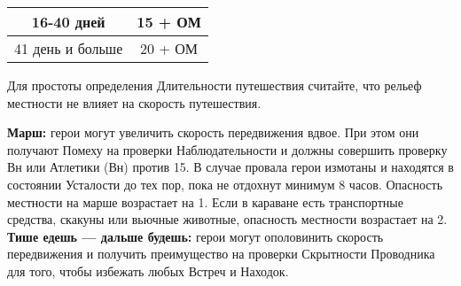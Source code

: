 \begin{enumerate}
\begin{center}
\begin{tabular}{|c|c|}
16-40 дней & 15 + ОМ \\ \hline
41 день и больше & 20 + ОМ \\ \hline
\end{tabular}
\end{center}
\begin{tcolorbox}
Для простоты определения Длительности путешествия считайте, что рельеф местности не влияет на скорость путешествия.
\end{tcolorbox}
\newline \textbf{Марш:} герои могут увеличить скорость передвижения вдвое. При этом они получают Помеху на проверки Наблюдательности и должны совершить проверку Вн или Атлетики (Вн) против 15. В случае провала герои измотаны и находятся в состоянии Усталости до тех пор, пока не отдохнут минимум 8 часов. Опасность местности на марше возрастает на 1. Если в караване есть транспортные средства, скакуны или вьючные животные, опасность местности возрастает на 2.
\newline \textbf{Тише едешь — дальше будешь:} герои могут ополовинить скорость передвижения и получить преимущество на проверки Скрытности Проводника для того, чтобы избежать любых Встреч и Находок.





\end{enumerate}
